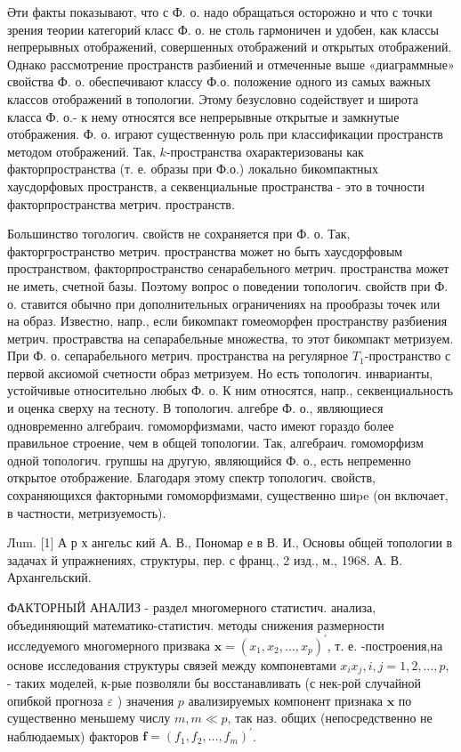 \documentclass[10pt]{article}
\begin{document}
Әти факты показывают, что с Ф. о. надо обращаться осторожно и что с точки зрения теории категорий класс Ф. о. не столь гармоничен и удобен, как классы непрерывных отображений, совершенных отображений и открытых отображений. Однако рассмотрение пространств разбиений и отмеченные выше «диаграммные» свойства Ф. о. обеспечивают классу Ф.о. положение одного из самых важных классов отображений в топологии. Этому безусловно содействует и широта класса Ф. о.- к нему относятся все непрерывные открытые и замкнутые отображения. Ф. о. играют существенную роль при классификации пространств методом отображений. Так, $k$-пространства охарактеризованы как факторпространства (т. е. образы при Ф.о.) локально бикомпактных хаусдорфовых пространств, а секвенциальные пространства - это в точности факторпространства метрич. пространств.



Большинство тогологич. свойств не сохраняется при Ф. о. Так, факторгространство метрич. пространства может но быть хаусдорфовым пространством, факторпространство сенарабельного метрич. пространства может не иметь, счетной базы. Поэтому вопрос о поведении топологич. свойств при Ф. о. ставится обычно при дополнительных ограничениях на прообразы точек или на образ. Известно, напр., если бикомпакт гомеоморфен пространству разбиения метрич. простравства на сепарабельные множества, то этот бикомпакт метризуем. При Ф. о. сепарабельного метрич. пространства на регулярное $T_{1}$-пространство с первой аксиомой счетности образ метризуем. Но есть топологич. инварианты, устойчивые относительно любых Ф. о. К ним относятся, напр., секвенциальность и оценка сверху на тесноту. В топологич. алгебре Ф. о., являющиеся одновременно алгебраич. гомоморфизмами, часто имеют гораздо более правильное строение, чем в общей топологии. Так, алгебраич. гомоморфизм одной топологич. групшы на другую, являющийся Ф. о., есть непременно открытое отображение. Благодаря этому спектр топологич. свойств, сохраняющихся факторными гомоморфизмами, существенно шиpe (он включает, в частности, метризуемость).



Лum. [1] А р х ангельс кий А. В., Пономар е в В. И., Основы общей топологии в задачах й упражнениях, структуры, пер. с франц., 2 изд., м., 1968. А. В. Архангельский.



ФАКТОРНЫЙ АНАЛИЗ - раздел многомерного статистич. анализа, объединяющий математико-статистич. методы снижения размерности исследуемого многомерного призвака $\boldsymbol{x}=\left(x_{1}, x_{2}, \ldots, x_{p}\right)^{\prime}$, т. е. -построения,на основе исследования структуры связей между компоневтами $x_{i} x_{j}, i, j=1,2, \ldots, p$, - таких моделей, к-рые позволяли бы восстанавливать (с нек-рой случайной опибкой прогноза $\varepsilon$ ) значения $p$ авализируемых компонент признака $\boldsymbol{x}$ по существенно меньшему числу $m, m \ll p$, так наз. общих (непосредственно не наблюдаемых) факторов $\boldsymbol{f}=\left(f_{1}, f_{2}, \ldots, f_{m}\right)^{\prime}$.
\end{document}
